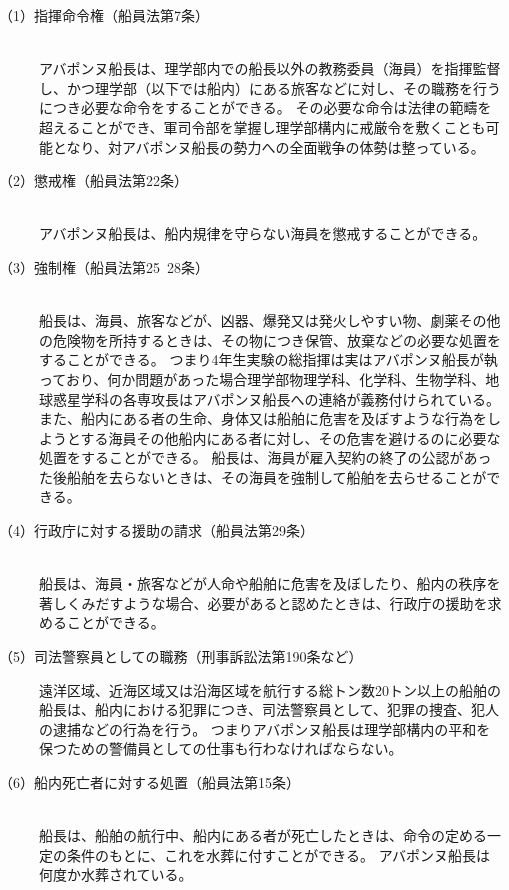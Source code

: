 \documentclass[12pt]{jsarticle}
\begin{document}
\begin{description}
\item[（1）指揮命令権（船員法第7条）]\mbox{}\\
アバポンヌ船長は、理学部内での船長以外の教務委員（海員）を指揮監督し、かつ理学部（以下では船内）にある旅客などに対し、その職務を行うにつき必要な命令をすることができる。
その必要な命令は法律の範疇を超えることができ、軍司令部を掌握し理学部構内に戒厳令を敷くことも可能となり、対アバポンヌ船長の勢力への全面戦争の体勢は整っている。

\item[（2）懲戒権（船員法第22条）]\mbox{}\\
アバポンヌ船長は、船内規律を守らない海員を懲戒することができる。

\item[（3）強制権（船員法第25~28条）]\mbox{}\\
船長は、海員、旅客などが、凶器、爆発又は発火しやすい物、劇薬その他の危険物を所持するときは、その物につき保管、放棄などの必要な処置をすることができる。
つまり4年生実験の総指揮は実はアバポンヌ船長が執っており、何か問題があった場合理学部物理学科、化学科、生物学科、地球惑星学科の各専攻長はアバポンヌ船長への連絡が義務付けられている。
また、船内にある者の生命、身体又は船舶に危害を及ぼすような行為をしようとする海員その他船内にある者に対し、その危害を避けるのに必要な処置をすることができる。
船長は、海員が雇入契約の終了の公認があった後船舶を去らないときは、その海員を強制して船舶を去らせることができる。

\item[（4）行政庁に対する援助の請求（船員法第29条）]\mbox{}\\
船長は、海員・旅客などが人命や船舶に危害を及ぼしたり、船内の秩序を著しくみだすような場合、必要があると認めたときは、行政庁の援助を求めることができる。

\item[（5）司法警察員としての職務（刑事訴訟法第190条など）]\mbox{}
遠洋区域、近海区域又は沿海区域を航行する総トン数20トン以上の船舶の船長は、船内における犯罪につき、司法警察員として、犯罪の捜査、犯人の逮捕などの行為を行う。
つまりアバポンヌ船長は理学部構内の平和を保つための警備員としての仕事も行わなければならない。

\item[（6）船内死亡者に対する処置（船員法第15条）]\mbox{}\\
船長は、船舶の航行中、船内にある者が死亡したときは、命令の定める一定の条件のもとに、これを水葬に付すことができる。
アバポンヌ船長は何度か水葬されている。
\end{description}
\end{document}
